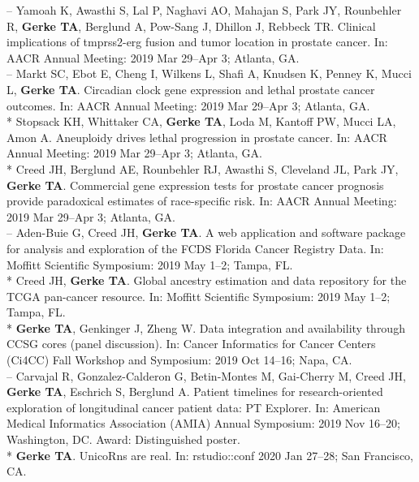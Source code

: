 \documentclass[11pt, a4paper]{article} %
\begin{document}
-- Yamoah K, Awasthi S, Lal P, Naghavi AO, Mahajan S, Park JY, Rounbehler R, {\bf Gerke TA}, Berglund A, Pow-Sang J, Dhillon J, Rebbeck TR. Clinical implications of tmprss2-erg fusion and tumor location in prostate cancer. In: AACR Annual Meeting: 2019 Mar 29--Apr 3; Atlanta, GA.\\

-- Markt SC, Ebot E, Cheng I, Wilkens L, Shafi A, Knudsen K, Penney K, Mucci L, {\bf Gerke TA}. Circadian clock gene expression and lethal prostate cancer outcomes. In: AACR Annual Meeting: 2019 Mar 29--Apr 3; Atlanta, GA.\\

* Stopsack KH, Whittaker CA, {\bf Gerke TA}, Loda M, Kantoff PW, Mucci LA, Amon A. Aneuploidy drives lethal progression in prostate cancer. In: AACR Annual Meeting: 2019 Mar 29--Apr 3; Atlanta, GA.\\

* Creed JH, Berglund AE, Rounbehler RJ, Awasthi S, Cleveland JL, Park JY, {\bf Gerke TA}. Commercial gene expression tests for prostate cancer prognosis provide  paradoxical estimates of race-specific risk. In: AACR Annual Meeting: 2019 Mar 29--Apr 3; Atlanta, GA.\\

-- Aden-Buie G, Creed JH, {\bf Gerke TA}. A web application and software package for analysis and exploration of the FCDS Florida Cancer Registry Data. In: Moffitt Scientific Symposium: 2019 May 1--2; Tampa, FL.\\

* Creed JH, {\bf Gerke TA}. Global ancestry estimation and data repository for the TCGA pan-cancer resource. In: Moffitt Scientific Symposium: 2019 May 1--2; Tampa, FL.\\

* {\bf Gerke TA}, Genkinger J, Zheng W. Data integration and availability through CCSG cores (panel discussion). In: Cancer Informatics for Cancer Centers (Ci4CC) Fall Workshop and Symposium: 2019 Oct 14--16; Napa, CA.\\

-- Carvajal R, Gonzalez-Calderon G, Betin-Montes M, Gai-Cherry M, Creed JH, {\bf Gerke TA}, Eschrich S, Berglund A. Patient timelines for research-oriented exploration of longitudinal cancer patient data: PT Explorer. In: American Medical Informatics Association (AMIA) Annual Symposium: 2019 Nov 16--20; Washington, DC. Award: Distinguished poster. \\

* {\bf Gerke TA}. UnicoRns are real. In: rstudio::conf 2020 Jan 27--28; San Francisco, CA.\\
\end{document}
